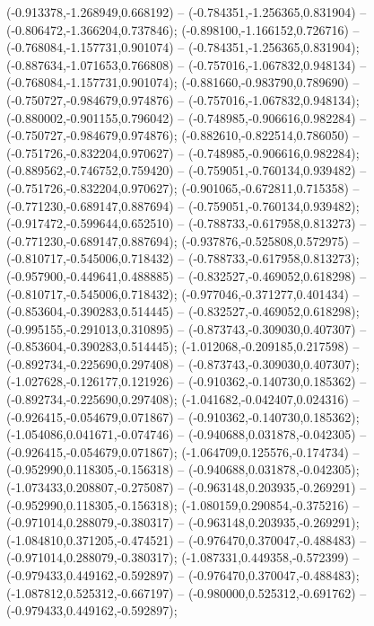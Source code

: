  (-0.913378,-1.268949,0.668192) -- (-0.784351,-1.256365,0.831904) -- (-0.806472,-1.366204,0.737846);
 (-0.898100,-1.166152,0.726716) -- (-0.768084,-1.157731,0.901074) -- (-0.784351,-1.256365,0.831904);
 (-0.887634,-1.071653,0.766808) -- (-0.757016,-1.067832,0.948134) -- (-0.768084,-1.157731,0.901074);
 (-0.881660,-0.983790,0.789690) -- (-0.750727,-0.984679,0.974876) -- (-0.757016,-1.067832,0.948134);
 (-0.880002,-0.901155,0.796042) -- (-0.748985,-0.906616,0.982284) -- (-0.750727,-0.984679,0.974876);
 (-0.882610,-0.822514,0.786050) -- (-0.751726,-0.832204,0.970627) -- (-0.748985,-0.906616,0.982284);
 (-0.889562,-0.746752,0.759420) -- (-0.759051,-0.760134,0.939482) -- (-0.751726,-0.832204,0.970627);
 (-0.901065,-0.672811,0.715358) -- (-0.771230,-0.689147,0.887694) -- (-0.759051,-0.760134,0.939482);
 (-0.917472,-0.599644,0.652510) -- (-0.788733,-0.617958,0.813273) -- (-0.771230,-0.689147,0.887694);
 (-0.937876,-0.525808,0.572975) -- (-0.810717,-0.545006,0.718432) -- (-0.788733,-0.617958,0.813273);
 (-0.957900,-0.449641,0.488885) -- (-0.832527,-0.469052,0.618298) -- (-0.810717,-0.545006,0.718432);
 (-0.977046,-0.371277,0.401434) -- (-0.853604,-0.390283,0.514445) -- (-0.832527,-0.469052,0.618298);
 (-0.995155,-0.291013,0.310895) -- (-0.873743,-0.309030,0.407307) -- (-0.853604,-0.390283,0.514445);
 (-1.012068,-0.209185,0.217598) -- (-0.892734,-0.225690,0.297408) -- (-0.873743,-0.309030,0.407307);
 (-1.027628,-0.126177,0.121926) -- (-0.910362,-0.140730,0.185362) -- (-0.892734,-0.225690,0.297408);
 (-1.041682,-0.042407,0.024316) -- (-0.926415,-0.054679,0.071867) -- (-0.910362,-0.140730,0.185362);
 (-1.054086,0.041671,-0.074746) -- (-0.940688,0.031878,-0.042305) -- (-0.926415,-0.054679,0.071867);
 (-1.064709,0.125576,-0.174734) -- (-0.952990,0.118305,-0.156318) -- (-0.940688,0.031878,-0.042305);
 (-1.073433,0.208807,-0.275087) -- (-0.963148,0.203935,-0.269291) -- (-0.952990,0.118305,-0.156318);
 (-1.080159,0.290854,-0.375216) -- (-0.971014,0.288079,-0.380317) -- (-0.963148,0.203935,-0.269291);
 (-1.084810,0.371205,-0.474521) -- (-0.976470,0.370047,-0.488483) -- (-0.971014,0.288079,-0.380317);
 (-1.087331,0.449358,-0.572399) -- (-0.979433,0.449162,-0.592897) -- (-0.976470,0.370047,-0.488483);
 (-1.087812,0.525312,-0.667197) -- (-0.980000,0.525312,-0.691762) -- (-0.979433,0.449162,-0.592897);
